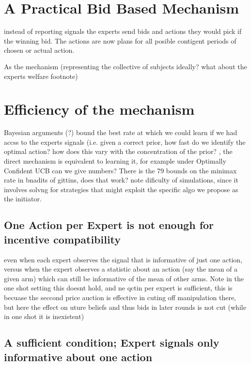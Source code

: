 \section{A Practical Bid Based Mechanism}

instead of reporting signals the experts send bids and actions they would pick if the winning bid. The actions are now plans for all posible contigent periods of chosen or actual action. 

As the mechanism (representing the collective of subjects ideally?  what about the experts welfare footnote) 




\section{Efficiency of the mechanism}



Bayesian arguments  (?)  bound the best rate at which we could learn if we had accss to the experts signals (i.e. given a correct prior, how fast do we identify the optimal action? how does this vary with the concentration of the prior? , the direct mechanism is equivalent to learning it, for example under Optimally Confident UCB can we give numbers? There is the 79 bounds on the minimax rate in bnadits of gittins, does that work? note dificulty of simulations, since it involves solvng for strategies that might exploit the specific algo we propose as the initiator.

\subsection{One Action per Expert is not enough for incentive compatibility}

even when each expert observes the signal that is informative of just one action, versus when the expert observes a statistic about an action (say the mean of a given arm) which can still be informative of the mean of other arms. Note in the one shot setting this doesnt hold, and ne qctin per expert is sufficient, this is becuase the seccond price auction is effective in cuting off manipulation there, but here the effect on uture beliefs and thus bids in later rounds is not cut (while in one shot it is inexistent)

\subsection{A sufficient condition; Expert signals only informative about one action}

